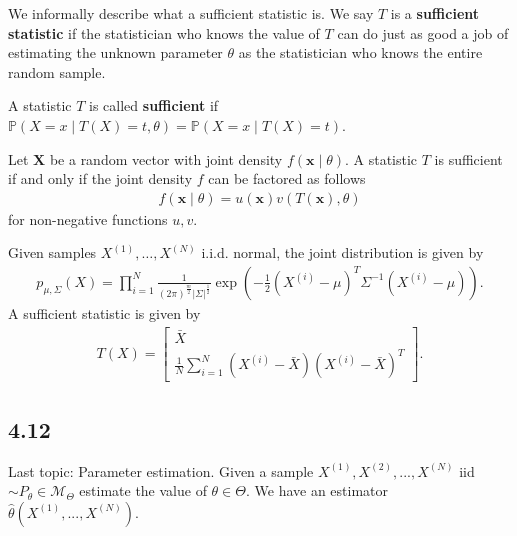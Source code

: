 \documentclass[a4paper, 11pt]{article}
\begin{document}
We informally describe what a sufficient statistic is. We say \( T \) is a \textbf{sufficient statistic} if the statistician who knows the value of \( T \) can do just as good a job of estimating the unknown parameter \( \theta \) as the statistician who knows the entire random sample.

\begin{defi}
  A statistic \( T \) is called \textbf{sufficient} if \( \mathbb P(X = x \mid T(X) = t, \theta) = \mathbb P(X = x \mid T(X) = t) \).
\end{defi}

\begin{thm}
  Let \( \mathbf X \) be a random vector with joint density \( f(\mathbf x \mid \theta) \). A statistic \( T \) is sufficient if and only if the joint density \( f \) can be factored as follows
  \begin{align*}
    f(\mathbf x \mid \theta) = u(\mathbf x) v(T(\mathbf x), \theta)
  \end{align*}
  for non-negative functions \( u,v \).
\end{thm}

\begin{eg}
  Given samples \( X^{(1)},  \dots, X^{(N)} \) i.i.d. normal, the joint distribution is given by 
  \begin{align*}
    p_{\mu, \Sigma}( X) = \prod^N_{i=1} \frac{1}{(2\pi)^{\frac{m}{2}} |\Sigma|^\frac{1}{2}} \exp{\left( -\frac{1}{2} (X^{(i)} - \mu)^T \Sigma^{-1}(X^{(i)} - \mu) \right)}.
  \end{align*}
  A sufficient statistic is given by 
  \begin{align*}
    T( X) = \begin{bmatrix}
      \bar X \\
      \frac{1}{N} \sum^N_{i=1} (X^{(i)} - \bar X)(X^{(i)} - \bar X)^T
    \end{bmatrix}.
  \end{align*}
\end{eg}



\clearpage


\subsection{4.12}

Last topic: Parameter estimation. Given a sample \( X^{(1)}, X^{(2)}, ..., X^{(N)} \) iid \( \sim P_\theta \in \mathcal{M}_{\Theta} \) estimate the value of \( \theta \in \Theta \). We have an estimator \( \hat \theta (X^{(1)} ,  ... , X^{(N)}) \).
\end{document}
